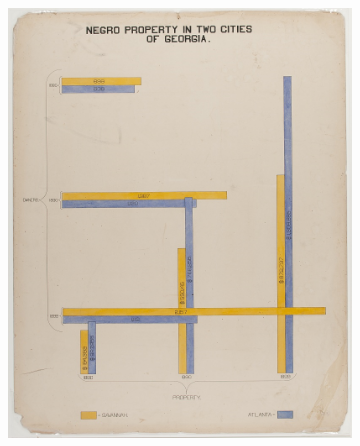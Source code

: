 \documentclass[../main.tex]{subfiles}
\begin{document}
\begin{figure}
\begin{subfigure}{.24\textwidth}
        \includegraphics[width=1\textwidth]{figures/intro/du_bois_bar.png}
        \caption{}
        \label{fig:intro_dpb}
    \end{subfigure}
    \begin{subfigure}{.24\textwidth}

\end{subfigure}
\end{figure}
\end{document}
